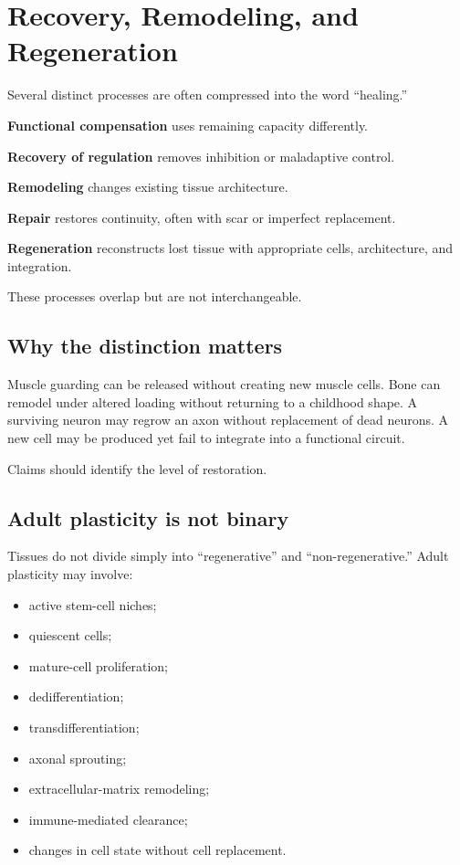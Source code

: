 \chapter{Recovery, Remodeling, and Regeneration}

Several distinct processes are often compressed into the word ``healing.''

\textbf{Functional compensation} uses remaining capacity differently.

\textbf{Recovery of regulation} removes inhibition or maladaptive control.

\textbf{Remodeling} changes existing tissue architecture.

\textbf{Repair} restores continuity, often with scar or imperfect replacement.

\textbf{Regeneration} reconstructs lost tissue with appropriate cells, architecture, and integration.

These processes overlap but are not interchangeable.

\section{Why the distinction matters}

Muscle guarding can be released without creating new muscle cells. Bone can remodel under altered loading without returning to a childhood shape. A surviving neuron may regrow an axon without replacement of dead neurons. A new cell may be produced yet fail to integrate into a functional circuit.

Claims should identify the level of restoration.

\section{Adult plasticity is not binary}

Tissues do not divide simply into ``regenerative'' and ``non-regenerative.'' Adult plasticity may involve:

\begin{itemize}
\tightlist
\item
  active stem-cell niches;
\item
  quiescent cells;
\item
  mature-cell proliferation;
\item
  dedifferentiation;
\item
  transdifferentiation;
\item
  axonal sprouting;
\item
  extracellular-matrix remodeling;
\item
  immune-mediated clearance;
\item
  changes in cell state without cell replacement.
\end{itemize}


